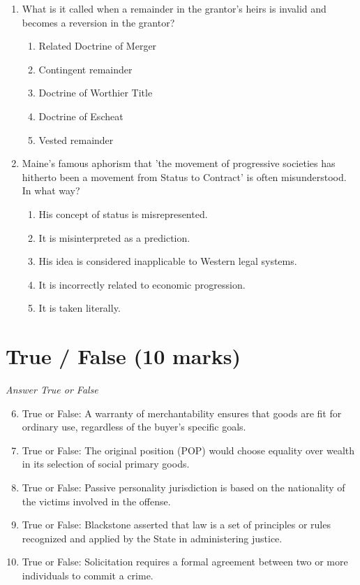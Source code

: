 \documentclass[12pt]{article}
\begin{document}
\begin{enumerate}[label=\arabic*.]
\begin{enumerate}[label=(\alph*)]
    \item Treaties create obligations for third States without their consent
\end{enumerate}
\item What is it called when a remainder in the grantor's heirs is invalid and becomes a reversion in the grantor?
\begin{enumerate}[label=(\alph*)]
    \item Related Doctrine of Merger
    \item Contingent remainder
    \item Doctrine of Worthier Title
    \item Doctrine of Escheat
    \item Vested remainder
\end{enumerate}
\item Maine's famous aphorism that 'the movement of progressive societies has hitherto been a movement from Status to Contract' is often misunderstood. In what way?
\begin{enumerate}[label=(\alph*)]
    \item His concept of status is misrepresented.
    \item It is misinterpreted as a prediction.
    \item His idea is considered inapplicable to Western legal systems.
    \item It is incorrectly related to economic progression.
    \item It is taken literally.
\end{enumerate}
\end{enumerate}

\section*{True / False (10 marks)}
\textit{Answer True or False}
\begin{enumerate}[label=\arabic*.]
\setcounter{enumi}{5}
\item True or False: A warranty of merchantability ensures that goods are fit for ordinary use, regardless of the buyer's specific goals.
\item True or False: The original position (POP) would choose equality over wealth in its selection of social primary goods.
\item True or False: Passive personality jurisdiction is based on the nationality of the victims involved in the offense.
\item True or False: Blackstone asserted that law is a set of principles or rules recognized and applied by the State in administering justice.
\item True or False: Solicitation requires a formal agreement between two or more individuals to commit a crime.
\end{enumerate}
\end{document}
